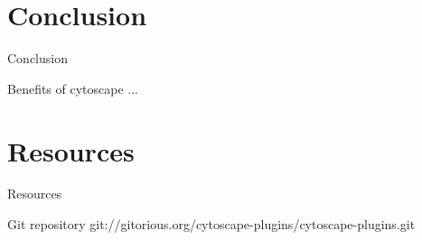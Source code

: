 \section{Conclusion}
\begin{frame}{Conclusion}
\begin{block}{Benefits of cytoscape}
...
\end{block}
\end{frame}

\section{Resources}
\begin{frame}{Resources}
\begin{block}{Git repository}
git://gitorious.org/cytoscape-plugins/cytoscape-plugins.git
\end{block}
\end{frame}
